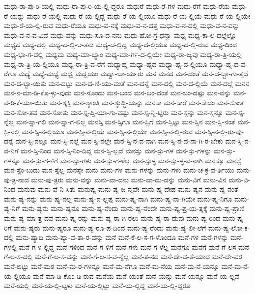 {ಮಧು-ರಾ-ಪು-ರಿ-ಯಲ್ಲಿ
ಮಧು-ರಾ-ಪು-ರಿ-ಯ-ಲ್ಲಿ-ದ್ದರೂ
ಮಧುರೆ
ಮಧು-ರೆ-ಗಳ
ಮಧು-ರೆಗೆ
ಮಧು-ರೆಯ
ಮಧು-ರೆ-ಯನ್ನು
ಮಧು-ರೆ-ಯಲ್ಲಿ
ಮಧು-ರೆ-ಯ-ಲ್ಲಿದ್ದ
ಮಧು-ರೆ-ಯ-ಲ್ಲಿಯೂ
ಮಧು-ರೆ-ಯ-ಲ್ಲಿಯೆ
ಮಧು-ರೆ-ಯ-ಲ್ಲಿಯೇ
ಮಧು-ರೆ-ಯ-ಲ್ಲಿ-ರುವ
ಮಧು-ರೆಯೂ
ಮಧು-ವ-ನಕ್ಕೆ
ಮಧು-ವ-ನ-ದತ್ತ
ಮಧು-ವ-ನ-ದಲ್ಲಿ
ಮಧು-ವ-ನ-ವನ್ನು
ಮಧು-ವ-ನ-ವ-ವಿದೆ
ಮಧು-ವನ್ನು
ಮಧು-ಸೂ-ದ-ನನು
ಮಧು-ಹೋ-ಗ್ರ-ಧನ್ವಾ
ಮಧ್ಯ
ಮಧ್ಯ-ಕಾ-ಲ-ದಲ್ಲೆಲ್ಲೊ
ಮಧ್ಯದ
ಮಧ್ಯ-ದಲ್ಲಿ
ಮಧ್ಯ-ದ-ಲ್ಲಿ-ಆ-ತನು
ಮಧ್ಯ-ದ-ಲ್ಲಿದ್ದ
ಮಧ್ಯ-ದ-ಲ್ಲಿಯೂ
ಮಧ್ಯ-ದ-ಲ್ಲಿ-ರುವ
ಮಧ್ಯ-ದಿಂದ
ಮಧ್ಯ-ಭಾ-ಗ-ದಲ್ಲಿ
ಮಧ್ಯಮ
ಮಧ್ಯ-ಮಾ-ಭ್ಯಾಂ
ಮಧ್ಯ-ಮಾ-ರ್ಗ-ದ-ಲ್ಲಿಯೇ
ಮಧ್ಯ-ರಾ-ಜ್ಯವು
ಮಧ್ಯ-ರಾ-ತ್ರಿ-ಯಲ್ಲಿ
ಮಧ್ಯ-ರಾ-ತ್ರಿ-ಯ-ಲ್ಲಿಯೂ
ಮಧ್ಯ-ರಾ-ತ್ರಿ-ವ-ರೆಗೆ
ಮಧ್ಯಾಹ್ನ
ಮಧ್ಯಾ-ಹ್ನದ
ಮಧ್ಯಾ-ಹ್ನ-ದ-ಲ್ಲಿಯೂ
ಮಧ್ಯಾ-ಹ್ನ-ದ-ವ-ರೆಗೂ
ಮಧ್ಯೆ
ಮಧ್ಯೆ-ಮಧ್ಯೆ
ಮಧ್ವ
ಮಧ್ವಯಂ
ಮಧ್ವಾ-ಚಾ-ರ್ಯರು
ಮನ
ಮನದ
ಮನ-ದಂತೆ
ಮನ-ದ-ಟ್ಟಾ-ಗು-ತ್ತದೆ
ಮನ-ದ-ಟ್ಟಾ-ಯಿತು
ಮನ-ದಟ್ಟು
ಮನ-ದ-ಣಿ-ಯು-ವಂತೆ
ಮನ-ದನ್ನೆ
ಮನ-ದಲ್ಲಿ
ಮನ-ದ-ಲ್ಲಿಯೆ
ಮನ-ದಲ್ಲೆ
ಮನನ
ಮನ-ನ-ಮಾ-ಡಿ-ಕೊ-ಳ್ಳು-ವುದು
ಮನ-ನೊಂದು
ಮನ-ಬಂದ
ಮನ-ಬಂ-ದಂತೆ
ಮನ-ಬಂ-ದಷ್ಟು
ಮನ-ವನ್ನು
ಮನ-ವ-ರಿ-ಕೆ-ಯಾ-ಯಿತು
ಮನ-ಶ್ಶಕ್ತಿ
ಮನ-ಶ್ಶಾಂತಿ
ಮನ-ಶ್ಶುದ್ಧಿ-ಯನ್ನು
ಮನಸಾ
ಮನ-ಸಾರೆ
ಮನ-ಸೇದಂ
ಮನ-ಸೋತ
ಮನ-ಸೋ-ತವ
ಮನ-ಸೋತು
ಮನ-ಸ್ತೃ-ಪ್ತಿ-ಯಾ-ಗು-ವಷ್ಟು
ಮನ-ಸ್ಸ-ನ್ನಿ-ಟ್ಟಿರು
ಮನ-ಸ್ಸನ್ನು
ಮನ-ಸ್ಸನ್ನೂ
ಮನ-ಸ್ಸ-ನ್ನೆಲ್ಲ
ಮನ-ಸ್ಸಾ-ಗಲಿ
ಮನ-ಸ್ಸಾ-ಗ-ಲಿಲ್ಲ
ಮನಸ್ಸಿ
ಮನ-ಸ್ಸಿಗೂ
ಮನ-ಸ್ಸಿಗೆ
ಮನ-ಸ್ಸಿಟ್ಟು
ಮನ-ಸ್ಸಿನ
ಮನ-ಸ್ಸಿ-ನಂತೆ
ಮನ-ಸ್ಸಿ-ನಲ್ಲಿ
ಮನ-ಸ್ಸಿ-ನ-ಲ್ಲಿಯೂ
ಮನ-ಸ್ಸಿ-ನ-ಲ್ಲಿಯೆ
ಮನ-ಸ್ಸಿ-ನ-ಲ್ಲಿಯೇ
ಮನ-ಸ್ಸಿ-ನ-ಲ್ಲಿ-ರುವ
ಮನ-ಸ್ಸಿ-ನ-ಲ್ಲಿ-ರು-ವು-ದನ್ನೆ
ಮನ-ಸ್ಸಿ-ನಲ್ಲೂ
ಮನ-ಸ್ಸಿ-ನಲ್ಲೆ
ಮನ-ಸ್ಸಿ-ನಲ್ಲೇ
ಮನ-ಸ್ಸಿ-ನ-ವ-ನಾಗಿ
ಮನ-ಸ್ಸಿ-ನ-ವ-ನಾ-ಗಿ-ರ-ಬೇಕು
ಮನ-ಸ್ಸಿ-ನ-ವ-ನಿಗೆ
ಮನ-ಸ್ಸಿ-ನಿಂದ
ಮನ-ಸ್ಸಿ-ನಿಂ-ದಿದ್ದ
ಮನ-ಸ್ಸಿ-ಲ್ಲದೆ
ಮನಸ್ಸು
ಮನ-ಸ್ಸು-ಗಳ
ಮನ-ಸ್ಸು-ಗಳನ್ನು
ಮನ-ಸ್ಸು-ಗಳನ್ನೂ
ಮನ-ಸ್ಸು-ಗ-ಳಿಗೆ
ಮನ-ಸ್ಸು-ಗಳು
ಮನ-ಸ್ಸು-ಗ-ಳೆಲ್ಲ
ಮನ-ಸ್ಸುಳ್ಳ
ಮನ-ಸ್ಸು-ಳ್ಳ-ವ-ನಾಗಿ
ಮನಸ್ಸೂ
ಮನಸ್ಸೆ
ಮನ-ಸ್ಸೆಂ-ಬುದು
ಮನ-ಸ್ಸೆಲ್ಲ
ಮನಸ್ಸೇ
ಮನು
ಮನು-ಗಳ
ಮನು-ಗಳನ್ನು
ಮನು-ಗಳು
ಮನು-ಚ-ಕ್ರ-ವ-ರ್ತಿಯು
ಮನು-ಪು-ತ್ರ-ನಾದ
ಮನು-ಪು-ತ್ರರು
ಮನು-ವನ್ನು
ಮನು-ವಾ-ದನು
ಮನು-ವಾ-ದು-ದನ್ನು
ಮನು-ವಿಗೆ
ಮನು-ವಿನ
ಮನು-ವಿ-ನಿಂದ
ಮನುವು
ಮನು-ವೆ-ನಿ-ಸಿತು
ಮನುಷ್ಯ
ಮನು-ಷ್ಯ-ಜ-ನ್ಮವೇ
ಮನು-ಷ್ಯ-ದೇಹ
ಮನು-ಷ್ಯನ
ಮನು-ಷ್ಯ-ನಂತೆ
ಮನು-ಷ್ಯ-ನನ್ನು
ಮನು-ಷ್ಯ-ನಲ್ಲ
ಮನು-ಷ್ಯ-ನ-ಲ್ಲಪ್ಪ
ಮನು-ಷ್ಯ-ನಾಗಿ
ಮನು-ಷ್ಯ-ನಾ-ಗಿಯೇ
ಮನು-ಷ್ಯ-ನಿಗೂ
ಮನು-ಷ್ಯ-ನಿಗೆ
ಮನು-ಷ್ಯನು
ಮನು-ಷ್ಯನೂ
ಮನು-ಷ್ಯ-ನೆಂದು
ಮನು-ಷ್ಯ-ನೆಂದೇ
ಮನು-ಷ್ಯ-ಪ್ರ-ಯ-ತ್ನಕ್ಕೆ
ಮನು-ಷ್ಯ-ಪ್ರಾಣಿ
ಮನು-ಷ್ಯ-ಮಾ-ತ್ರ-ದವ
ಮನು-ಷ್ಯ-ರನ್ನು
ಮನು-ಷ್ಯ-ರಾ-ಗಿ-ರಲು
ಮನು-ಷ್ಯ-ರಾ-ದುವು
ಮನು-ಷ್ಯ-ರಿಂದ
ಮನು-ಷ್ಯ-ರಿಗೆ
ಮನು-ಷ್ಯರು
ಮನು-ಷ್ಯರೂ
ಮನು-ಷ್ಯ-ರೂ-ಪ-ದಿಂದ
ಮನು-ಷ್ಯ-ರೆಂದು
ಮನು-ಷ್ಯ-ಲೀ-ಲೆಗೆ
ಮನು-ಷ್ಯ-ಲೋ-ಕ-ದಲ್ಲಿ
ಮನು-ಷ್ಯಾದಿ
ಮನು-ಷ್ಯಾ-ವ-ತಾ-ರ-ವನ್ನು
ಮನೆ
ಮನೆ-ಕೆ-ಲ-ಸ-ಗ-ಳೊಂದೂ
ಮನೆ-ಗಳ
ಮನೆ-ಗಳನ್ನು
ಮನೆ-ಗಳಲ್ಲಿ
ಮನೆ-ಗ-ಳ-ಲ್ಲಿದ್ದ
ಮನೆ-ಗಳಿಂದ
ಮನೆ-ಗ-ಳಿಗೆ
ಮನೆ-ಗಳು
ಮನೆ-ಗ-ಳೆಲ್ಲ
ಮನೆಗೂ
ಮನೆಗೆ
ಮನೆ-ಗೆ-ಲಸ
ಮನೆ-ಗೆ-ಲ-ಸ-ದಲ್ಲಿ
ಮನೆ-ಗೆ-ಲ-ಸ-ವನ್ನು
ಮನೆ-ಗೆ-ಲ-ಸ-ವ-ನ್ನೆಲ್ಲ
ಮನೆ-ತ-ನದ
ಮನೆ-ದೇ-ವ-ತೆ-ಯಾದ
ಮನೆ-ದೇ-ವರ
ಮನೆ-ಬಿಟ್ಟು
ಮನೆ-ಮಠ
ಮನೆ-ಮ-ಠ-ಗಳನ್ನೂ
ಮನೆ-ಮ-ನೆಗೂ
ಮನೆ-ಮ-ನೆಯ
ಮನೆ-ಮ-ನೆ-ಯನ್ನೂ
ಮನೆ-ಮ-ನೆ-ಯ-ಲ್ಲಿಯೂ
ಮನೆ-ಮಾ-ಡಿ-ಕೊಂ-ಡಿ-ರುವ
ಮನೆಯ
ಮನೆ-ಯಂತೆ
ಮನೆ-ಯನ್ನು
ಮನೆ-ಯನ್ನೂ
ಮನೆ-ಯ-ಲ್ಲವೆ
ಮನೆ-ಯಲ್ಲಿ
ಮನೆ-ಯ-ಲ್ಲಿ-ಟ್ಟಳು
ಮನೆ-ಯ-ಲ್ಲಿಟ್ಟು
ಮನೆ-ಯ-ಲ್ಲಿದ್ದ
ಮನೆ-ಯ-ಲ್ಲಿ-ದ್ದರೂ
}
